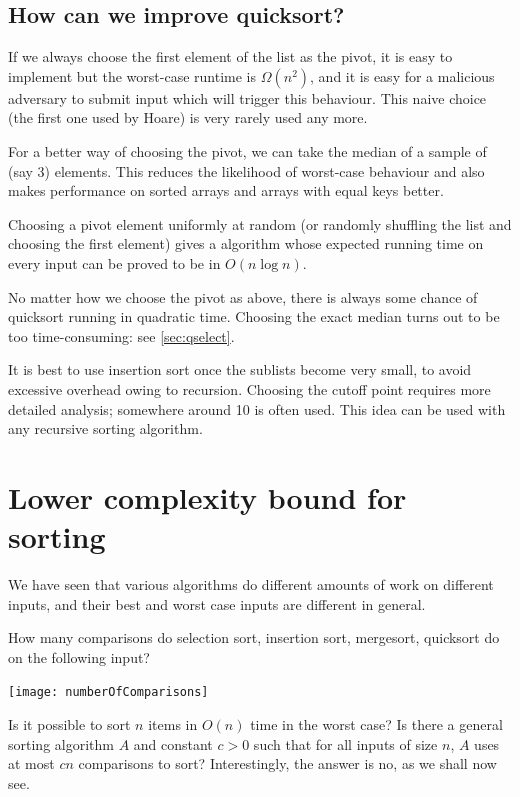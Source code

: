 \section{How can we improve quicksort?}
If we always choose the first element of the list as the pivot, it is easy to implement but
the worst-case runtime is $\Omega(n^2)$, and it is easy for a malicious adversary to submit input 
which will trigger this behaviour. This naive choice (the first one used by Hoare) is very rarely used any more.

For a better way of choosing the pivot, we can take the median of a sample of (say 3) elements. This reduces the 
likelihood of worst-case behaviour and also makes performance on sorted arrays 
and arrays with equal keys better. 

Choosing a pivot element uniformly at random (or randomly shuffling the list and choosing the first element) 
gives a  
algorithm whose expected running time on every input can be proved to be in 
$O(n \log n)$. 

No matter how we choose the pivot as above, there is always some chance of quicksort running in quadratic time. 
Choosing the exact median turns out to be too time-consuming: see \cref{sec:qselect}.

It is best to use insertion sort once the sublists become very small, to 
avoid excessive overhead owing to recursion. 
Choosing the cutoff point requires more detailed analysis; somewhere around 10 is often used. 
This idea can be used with any recursive sorting algorithm.


\chapter{Lower complexity bound for sorting} %
\label{sec:lowerbound}
We have seen that various algorithms do different amounts of work on different inputs, 
and their best and worst case inputs are different in general.

\begin{Boxample}
How many comparisons do selection sort, insertion sort, mergesort, quicksort do on the following input?
\begin{center}
\texttt{[image: numberOfComparisons]}
\end{center}
\end{Boxample} 

Is it possible to sort $n$ items in $O(n)$ time in the worst case? 
Is there a general sorting algorithm $A$ and constant $c>0$ such that for all inputs of size $n$, 
$A$ uses at most $cn$ comparisons to sort? Interestingly, the answer is no, as we shall now see.

